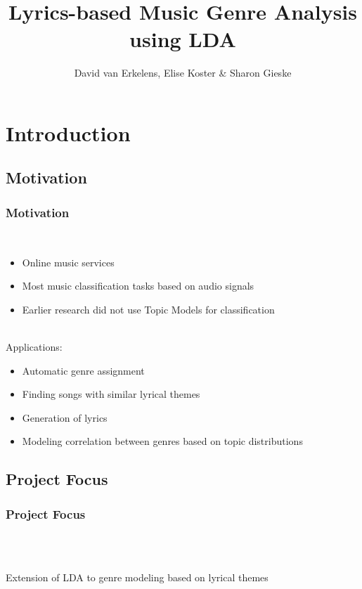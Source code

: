 \documentclass[t,ignorenonframetext]{beamer}
\title{Lyrics-based Music Genre Analysis using LDA}
\author{David van Erkelens, Elise Koster \& Sharon Gieske}
\begin{document}
\frame{
\maketitle
}
\frame{
\tableofcontents
}

\section[Introduction]{Introduction}

\subsection{Motivation}
\begin{frame}
\frametitle{Motivation}
~\\
\begin{itemize}
	\item Online music services 
	\item Most music classification tasks based on audio signals 
	\item Earlier research did not use Topic Models for classification
\end{itemize}
~\\Applications:
\begin{itemize}
\item Automatic genre assignment
\item Finding songs with similar lyrical themes
\item Generation of lyrics
\item Modeling correlation between genres based on topic distributions
\end{itemize}
\end{frame}

\subsection{Project Focus}
\begin{frame}
\frametitle{Project Focus}
~\\~\\
\begin{center}
\Large{Extension of LDA to genre modeling based on lyrical themes}
\end{center}
~\\~\\
\end{frame}
\end{document}
